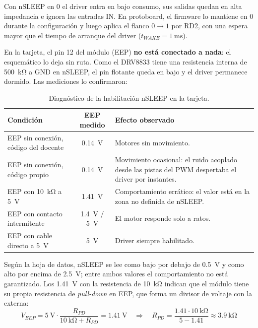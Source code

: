 Con nSLEEP en 0 el driver entra en bajo consumo, sus salidas quedan en alta
impedancia e ignora las entradas IN. En protoboard, el firmware lo mantiene en
0 durante la configuración y luego aplica el flanco $0 \rightarrow 1$ por RD2,
con una espera mayor que el tiempo de arranque del driver ($t_{WAKE} =
\SI{1}{\milli\second}$).

En la tarjeta, el pin 12 del módulo (EEP) \textbf{no está conectado a nada}: el
esquemático lo deja sin ruta. Como el DRV8833 tiene una resistencia interna de
\SI{500}{\kilo\ohm} a GND en nSLEEP, el pin flotante queda en bajo y el driver
permanece dormido. Las mediciones lo confirmaron:

\begin{table}[H]
  \centering
  \caption{Diagnóstico de la habilitación nSLEEP en la tarjeta.}
  \label{tab:eep}
  \small
  \begin{tabularx}{\textwidth}{@{}L c L@{}}
    \toprule
    \textbf{Condición} & \textbf{EEP medido} & \textbf{Efecto observado} \\
    \midrule
    EEP sin conexión, código del docente & \SI{0.14}{\volt} & Motores sin movimiento. \\
    EEP sin conexión, código propio & \SI{0.14}{\volt} & Movimiento ocasional: el ruido acoplado desde las pistas del PWM despertaba el driver por instantes. \\
    EEP con \SI{10}{\kilo\ohm} a \SI{5}{\volt} & \SI{1.41}{\volt} & Comportamiento errático: el valor está en la zona no definida de nSLEEP. \\
    EEP con contacto intermitente & \SI{1.4}{\volt} / \SI{5}{\volt} & El motor responde solo a ratos. \\
    EEP con cable directo a \SI{5}{\volt} & \SI{5}{\volt} & Driver siempre habilitado. \\
    \bottomrule
  \end{tabularx}
\end{table}

Según la hoja de datos, nSLEEP se lee como bajo por debajo de \SI{0.5}{\volt}
y como alto por encima de \SI{2.5}{\volt}; entre ambos valores el
comportamiento no está garantizado. Los \SI{1.41}{\volt} con la resistencia de
\SI{10}{\kilo\ohm} indican que el módulo tiene su propia resistencia de
\emph{pull-down} en EEP, que forma un divisor de voltaje con la externa:
\begin{equation}
  V_{EEP} = \SI{5}{\volt}\cdot\frac{R_{PD}}{\SI{10}{\kilo\ohm}+R_{PD}} = \SI{1.41}{\volt}
  \quad\Rightarrow\quad
  R_{PD} = \frac{1.41 \cdot \SI{10}{\kilo\ohm}}{5 - 1.41} \approx \SI{3.9}{\kilo\ohm}
\end{equation}

